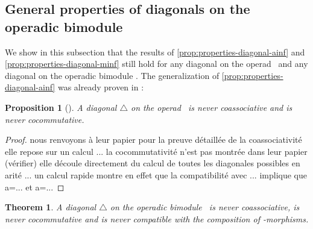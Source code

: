 \documentclass[twoside, 12pt]{amsart}
\newtheorem{proposition}[definition]{Proposition}
\newtheorem{theorem}{Theorem}
\theoremstyle{remark}
\begin{document}

\subsection{General properties of diagonals on the operadic bimodule \Minf}

We show in this subsection that the results of \cref{prop:properties-diagonal-ainf} and \cref{prop:properties-diagonal-minf} still hold for any diagonal on the operad \Ainf\ and any diagonal on the operadic bimodule \Minf . The generalization of \cref{prop:properties-diagonal-ainf} was already proven in \cite{MarklShnider06} :

\begin{proposition}[{\cite[Theorem 13]{MarklShnider06}}]
  \label{prop:nocoassoc}
  A diagonal $\triangle$ on the operad \Ainf\ is never coassociative and is never cocommutative.  
\end{proposition} 

\begin{proof}
nous renvoyons à leur papier pour la preuve détaillée de la coassociativité
elle repose sur un calcul ...
la cocommutativité n'est pas montrée dans leur papier (vérifier)
elle découle directement du calcul de toutes les diagonales possibles en arité ...
un calcul rapide montre en effet que la compatibilité avec ... implique que a=... et a=...
\end{proof}


\begin{theorem} 
  \label{thm:nofunctorial}
  A diagonal $\triangle$ on the operadic bimodule \Minf\ is never coassociative, is never cocommutative and is never compatible with the composition of \Ainf -morphisms.  
\end{theorem}
\end{document}
